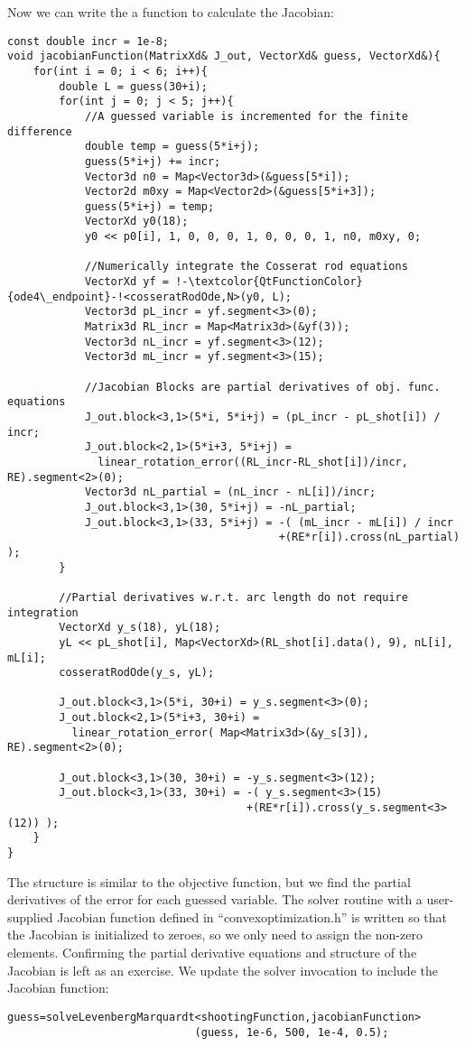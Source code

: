 \documentclass[12pt]{article}
\begin{document}
\clearpage \noindent
Now we can write the a function to calculate the Jacobian:
\begin{lstlisting}
const double incr = 1e-8;
void jacobianFunction(MatrixXd& J_out, VectorXd& guess, VectorXd&){
    for(int i = 0; i < 6; i++){
        double L = guess(30+i);
        for(int j = 0; j < 5; j++){
            //A guessed variable is incremented for the finite difference
            double temp = guess(5*i+j);
            guess(5*i+j) += incr;
            Vector3d n0 = Map<Vector3d>(&guess[5*i]);
            Vector2d m0xy = Map<Vector2d>(&guess[5*i+3]);
            guess(5*i+j) = temp;
            VectorXd y0(18);
            y0 << p0[i], 1, 0, 0, 0, 1, 0, 0, 0, 1, n0, m0xy, 0;

            //Numerically integrate the Cosserat rod equations
            VectorXd yf = !-\textcolor{QtFunctionColor}{ode4\_endpoint}-!<cosseratRodOde,N>(y0, L);
            Vector3d pL_incr = yf.segment<3>(0);
            Matrix3d RL_incr = Map<Matrix3d>(&yf(3));
            Vector3d nL_incr = yf.segment<3>(12);
            Vector3d mL_incr = yf.segment<3>(15);

            //Jacobian Blocks are partial derivatives of obj. func. equations
            J_out.block<3,1>(5*i, 5*i+j) = (pL_incr - pL_shot[i]) / incr;
            J_out.block<2,1>(5*i+3, 5*i+j) =
              linear_rotation_error((RL_incr-RL_shot[i])/incr, RE).segment<2>(0);
            Vector3d nL_partial = (nL_incr - nL[i])/incr;
            J_out.block<3,1>(30, 5*i+j) = -nL_partial;
            J_out.block<3,1>(33, 5*i+j) = -( (mL_incr - mL[i]) / incr
                                          +(RE*r[i]).cross(nL_partial) );
        }

        //Partial derivatives w.r.t. arc length do not require integration
        VectorXd y_s(18), yL(18);
        yL << pL_shot[i], Map<VectorXd>(RL_shot[i].data(), 9), nL[i], mL[i];
        cosseratRodOde(y_s, yL);

        J_out.block<3,1>(5*i, 30+i) = y_s.segment<3>(0);
        J_out.block<2,1>(5*i+3, 30+i) =
          linear_rotation_error( Map<Matrix3d>(&y_s[3]), RE).segment<2>(0);

        J_out.block<3,1>(30, 30+i) = -y_s.segment<3>(12);
        J_out.block<3,1>(33, 30+i) = -( y_s.segment<3>(15)
                                     +(RE*r[i]).cross(y_s.segment<3>(12)) );
    }
}
\end{lstlisting}
The structure is similar to the objective function, but we find the partial derivatives of the error for each guessed variable. The solver routine with a user-supplied Jacobian function defined in ``convexoptimization.h'' is written so that the Jacobian is initialized to zeroes, so we only need to assign the non-zero elements. Confirming the partial derivative equations and structure of the Jacobian is left as an exercise. We update the solver invocation to include the Jacobian function:
\begin{lstlisting}
guess=solveLevenbergMarquardt<shootingFunction,jacobianFunction>
                             (guess, 1e-6, 500, 1e-4, 0.5);
\end{lstlisting}
\end{document}
